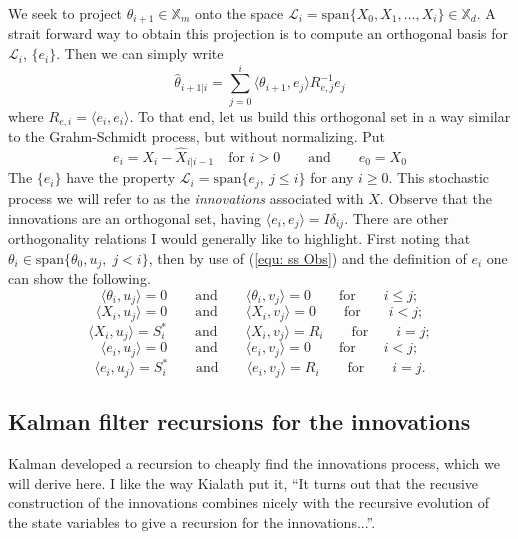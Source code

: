 \documentclass[12pt]{amsart}
\renewcommand{\and}{\qquad\text{and}\qquad}
\renewcommand{\and}{\qquad\text{and}\qquad }
\begin{document}
We seek to project $\theta_{i+1}\in \mathbb{X}_m$ onto the space $\mathcal{L}_i = \text{span} \{X_0,X_1,\dots,X_{i}\}\in \mathbb{X}_d$. A strait forward way to obtain this projection is to compute an orthogonal basis for $\mathcal{L}_i$, $\{e_i\}$.  Then we can simply write 
\begin{equation}
\hat{\theta}_{i+1|i} = \sum_{j=0}^i \langle \theta_{i+1}, e_j \rangle R^{-1}_{e,j} e_j\label{equ: projection}
\end{equation}
where $R_{e,i} = \langle e_i, e_i \rangle$. To that end, let us build this orthogonal set in a way similar to the Grahm-Schmidt process, but without normalizing. Put
$$e_i = X_i - \hat{X}_{i|i-1}\quad \text{for }i>0\qquad\text{and}\qquad e_0 = X_0$$
The $\{e_i\}$ have the property $\mathcal{L}_i = \text{span}\{e_j,~j\le i\}$ for any $i\ge 0$. This stochastic process we will refer to as the \textit{innovations} associated with $X$. Observe that the innovations are an orthogonal set, having $\langle e_i,e_j \rangle = I\delta_{ij}$. There are other orthogonality relations I would generally like to highlight. First noting that $\theta_i \in \text{span}\{\theta_0, u_j,\; j<i\}$, then by use of (\ref{equ: ss Obs}) and the definition of $e_i$ one can show the following.
$$\langle \theta_i, u_j \rangle = 0 \and \langle \theta_i, v_j \rangle = 0 \qquad\text{for}\qquad i\le j;$$
$$\langle X_i, u_j \rangle = 0 \and \langle X_i, v_j \rangle = 0 \qquad\text{for}\qquad i < j;$$
$$\langle X_i, u_j \rangle = S^*_i \and \langle X_i, v_j \rangle = R_i \qquad\text{for}\qquad i = j;$$ 
$$\langle e_i, u_j \rangle = 0 \and \langle e_i, v_j \rangle = 0 \qquad\text{for}\qquad i < j;$$
$$\langle e_i, u_j \rangle = S^*_i \and \langle e_i, v_j \rangle = R_i \qquad\text{for}\qquad i = j.$$


\subsection{Kalman filter recursions for the innovations}

Kalman developed a recursion to cheaply find the innovations process, which we will derive here.
I like the way Kialath put it, ``It turns out that the recusive construction of the innovations combines nicely with the recursive evolution of the state variables to give a recursion for the innovations...''\cite[p.~312]{kailath2000}.
\end{document}
